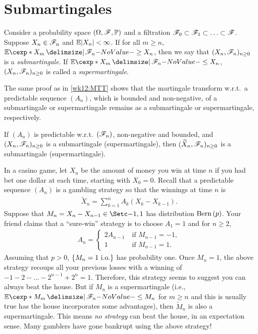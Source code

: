 \documentclass[12pt]{article}
\begin{document}


\section{Submartingales}

\begin{Definition}
Consider a probability space $(\Omega, \scF, \P)$ and a filtration $\mathscr{F}_0 \subset \mathscr{F}_1 \subset \ldots \subset \mathscr{F}$. Suppose $X_n \in \mathscr{F}_n$ and $\E|X_n|<\infty$. If for all $m\geq n$, $\E[X_m \given \scF_n] \geq X_n$, then we say that $(X_n,\mathscr{F}_n)_{n\geq0}$ is a \emph{submartingale}. If $\E[X_m \given \scF_n] \leq X_n$, $(X_n,\mathscr{F}_n)_{n\geq0}$ is called a \emph{supermartingale}.
\end{Definition}

The same proof as in \cref{wk12:MTT} shows that the martingale transform w.r.t.\ a predictable sequence $(A_n)$, which is bounded and non-negative, of a submartingale or supermartingale remains as a submartingale or supermartingale, respectively. 

\begin{Theorem}[MTT] \label{wk14:MTT}
If $(A_n)$ is predictable w.r.t.\ $(\mathscr{F}_n)$, non-negative and bounded, and $(X_n,\mathscr{F}_n)_{n\geq0}$ is a submartingale (supermartingale), then $(\widetilde{X}_n, \mathscr{F}_n)_{n\geq0}$ is a submartingale (supermartingale).
\end{Theorem}

\begin{Example}
In a casino game, let $X_n$ be the amount of money you win at time $n$ if you had bet one dollar at each time, starting with $X_0=0$. Recall that a predictable sequence $(A_n)$ is a gambling strategy so that the winnings at time $n$ is 
\begin{align*}
\widetilde{X}_n = \sum_{k=1}^n A_k(X_k-X_{k-1}).
\end{align*}
Suppose that $M_n = X_n - X_{n-1} \in \set{-1,1}$ has distribution $\Bern{p}$. Your friend claims that a ``sure-win'' strategy is to choose $A_1=1$ and for $n\geq2$, 
\begin{align*}
A_n = \left\{
\begin{array}{ll}
2A_{n-1} &\ \text{if $M_{n-1}=-1$},\\
1 &\ \text{if $M_{n-1}=1$}.
\end{array} \right.
\end{align*}
Assuming that $p>0$, $\{M_n=1 \ \mathrm{i.o.}\}$ has probability one. Once $M_n=1$, the above strategy recoups all your previous losses with a winning of $-1-2 - \ldots - 2^{n-1} + 2^n = 1$. Therefore, this strategy seems to suggest you can always beat the house. But if $M_n$ is a supermartingale (i.e., $\E[M_m \given \scF_n] \leq M_n$ for $m\geq n$ and this is usually true has the house incorporates some advantages), then $\widetilde{M}_n$ is also a supermartingale. This means \emph{no strategy} can beat the house, in an expectation sense. Many gamblers have gone bankrupt using the above strategy! 
\end{Example}
\end{document}
